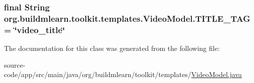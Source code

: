 \subsubsection[{\texorpdfstring{T\+I\+T\+L\+E\+\_\+\+T\+AG}{TITLE_TAG}}]{\setlength{\rightskip}{0pt plus 5cm}final String org.\+buildmlearn.\+toolkit.\+templates.\+Video\+Model.\+T\+I\+T\+L\+E\+\_\+\+T\+AG = \char`\"{}video\+\_\+title\char`\"{}\hspace{0.3cm}{\ttfamily [static]}}\hypertarget{classorg_1_1buildmlearn_1_1toolkit_1_1templates_1_1VideoModel_aab6348f79865d09d59abad5e6cbd183b}{}\label{classorg_1_1buildmlearn_1_1toolkit_1_1templates_1_1VideoModel_aab6348f79865d09d59abad5e6cbd183b}


The documentation for this class was generated from the following file\+:\begin{DoxyCompactItemize}
\item 
source-\/code/app/src/main/java/org/buildmlearn/toolkit/templates/\hyperlink{templates_2VideoModel_8java}{Video\+Model.\+java}\end{DoxyCompactItemize}
